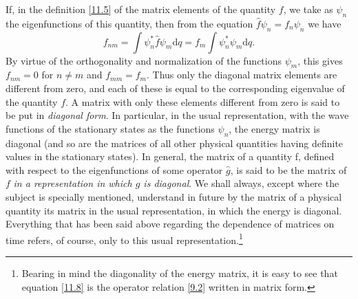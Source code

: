 If, in the definition \eqref{11.5} of the matrix elements of the quantity $ f $, we take as $\psi_n$ the eigenfunctions of this quantity, then from the equation $ \hat{f}\psi_n=f_n\psi_n $ we have
\[ f_{nm}=\int\psi_n^*\hat{f}\psi_m\mathrm{d}q=f_m\int\psi_n^*\psi_m\mathrm{d}q. \]
By virtue of the orthogonality and normalization of the functions $\psi_m$, this gives $ f_{nm}= 0 $ for $ n\ne m $ and $ f_{mm} = f_m $. Thus only the diagonal matrix elements are different from zero, and each of these is equal to the corresponding eigenvalue of the quantity $ f $. A matrix with only these elements different from zero is said to be put in \textit{diagonal form}. In particular, in the usual representation, with the wave functions of the stationary states as the functions $\psi_n$, the energy matrix is diagonal (and so are the matrices of all other physical quantities having definite values in the stationary states). In general, the matrix of a quantity f, defined with respect to the eigenfunctions of some operator $ \hat{g} $, is said to be the matrix of $ f $ \textit{in a representation in which $ g $ is diagonal}. We shall always, except where the subject is specially mentioned, understand in future by the matrix of a physical quantity its matrix in the usual representation, in which the energy is diagonal. Everything that has been said above regarding the dependence of matrices on time refers, of course, only to this usual representation.\footnote{Bearing in mind the diagonality of the energy matrix, it is easy to see that equation \eqref{11.8} is the operator relation \eqref{9.2} written in matrix form.
}


